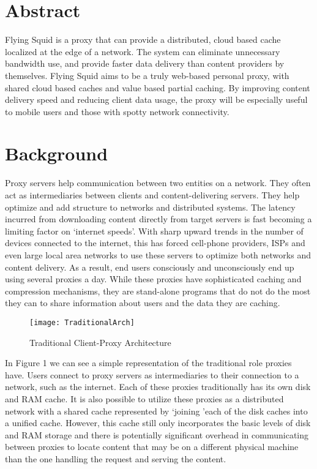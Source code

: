 \section{Abstract}

Flying Squid is a proxy that can provide a distributed, cloud based cache localized at the edge of a network. The system can eliminate unnecessary bandwidth use, and provide faster data delivery than content providers by themselves. Flying Squid aims to be a truly web-based personal proxy, with shared cloud based caches and value based partial caching. By improving content delivery speed and reducing client data usage, the proxy will be especially useful to mobile users and those with spotty network connectivity.

\section{Background}

Proxy servers help communication between two entities on a network. They often act as intermediaries between clients and content-delivering servers. They help optimize and add structure to networks and distributed systems. The latency incurred from downloading content directly from target servers is fast becoming a limiting factor on ‘internet speeds’. With sharp upward trends in the number of devices connected to the internet, this has forced cell-phone providers, ISPs and even large local area networks to use these servers to optimize both networks and content delivery. As a result, end users consciously and unconsciously end up using several proxies a day. While these proxies have sophisticated caching and compression mechanisms, they are stand-alone programs that do not do the most they can to share information about users and the data they are caching.

\begin{figure}[H] \centering
\texttt{[image: TraditionalArch]}
\caption{Traditional Client-Proxy Architecture}
\end{figure}


In Figure 1 we can see a simple representation of the traditional role proxies have. Users connect to proxy servers as intermediaries to their connection to a network, such as the internet. Each of these proxies traditionally has its own disk and RAM cache. It is also possible to utilize these proxies as a distributed network with a shared cache represented by \lq joining \rq each of the disk caches into a unified cache. However, this cache still only incorporates the basic levels of disk and RAM storage and there is potentially significant overhead in communicating between proxies to locate content that may be on a different physical machine than the one handling the request and serving the content.


